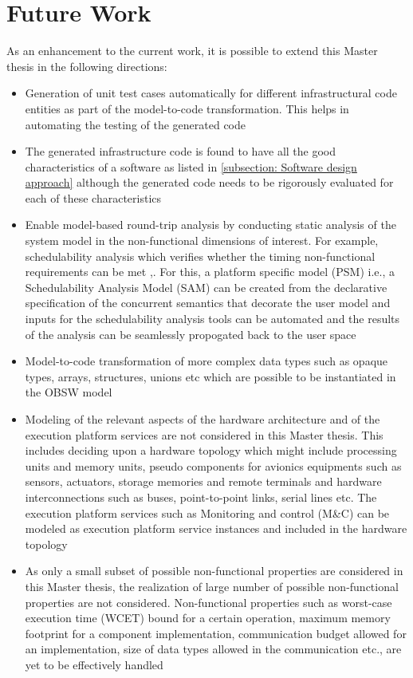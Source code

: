 \section{Future Work}
As an enhancement to the current work, it is possible to extend this Master thesis in the following directions:
\begin{itemize}
\item Generation of unit test cases automatically for different infrastructural code entities as part of the model-to-code transformation. This helps in automating the testing of the generated code 
\item The generated infrastructure code is found to have all the good characteristics of a software as listed in \cref{subsection: Software design approach} although the generated code needs to be rigorously evaluated for each of these characteristics 
\item Enable model-based round-trip analysis by conducting static analysis of the system model in the non-functional dimensions of interest. For example, schedulability analysis which verifies whether the timing non-functional requirements can be met \cite{ScheduAnaly},\cite{CompBasedProcess}.  For this, a platform specific model (PSM) i.e., a Schedulability Analysis Model (SAM) can be created from the declarative specification of the concurrent semantics that decorate the user model and inputs for the schedulability analysis tools can be automated and the results of the analysis can be seamlessly propogated back to the user space \cite{ScheduAnaly}
\item Model-to-code transformation of more complex data types such as opaque types, arrays, structures, unions etc which are possible to be instantiated in the OBSW model
\item Modeling of the relevant aspects of the hardware architecture and of the execution platform services are not considered in this Master thesis. This includes deciding upon a hardware topology which might include processing units and memory units, pseudo components for avionics equipments such as sensors, actuators, storage memories and remote terminals and hardware interconnections such as buses, point-to-point links, serial lines etc. The execution platform services such as Monitoring and control (M\&C) can be modeled as execution platform service instances and included in the hardware topology  
\item As only a small subset of possible non-functional properties are considered in this Master thesis, the realization of large number of possible non-functional properties are not considered. Non-functional properties such as worst-case execution time (WCET) bound for a certain operation, maximum memory footprint for a component implementation, communication budget allowed for an implementation, size of data types allowed in the communication etc., are yet to be effectively handled

\end{itemize}
